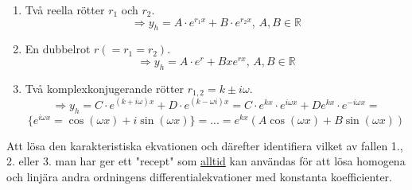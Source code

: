 \begin{enumerate}
    \item Två reella rötter $r_1$ och $r_2$.\\
          \begin{equation*}
              \Rightarrow y_h=A\cdot e^{r_1x}+B\cdot e^{r_2x},\, A,B\in\mathbb{R}
          \end{equation*}
    \item En dubbelrot $r(=r_1=r_2)$.\\
          \begin{equation*}
              \Rightarrow y_h=A\cdot e^{r}+Bxe^{rx},\, A,B\in\mathbb{R}
          \end{equation*}
    \item Två komplexkonjugerande rötter $r_{1,2}=k\pm i\omega$.
          \begin{equation*}
              \Rightarrow y_h=C\cdot e^{(k+i\omega)x}+D\cdot e^{(k-\omega i)x}=
              C\cdot e^{kx}\cdot e^{i\omega x}+De^{kx}\cdot e^{-i\omega x}=
          \end{equation*}
          \begin{equation*}
              \{e^{i\omega x}=\cos(\omega x)+i\sin(\omega x)\}=
              ...=
              e^{kx}(A\cos(\omega x)+B\sin(\omega x))
          \end{equation*}
\end{enumerate}
Att lösa den karakteristiska ekvationen och därefter identifiera vilket av fallen 1., 2. eller 3. man har ger ett "recept" som \underline{alltid} kan användas för att lösa homogena och linjära andra ordningens differentialekvationer med konstanta koefficienter.

